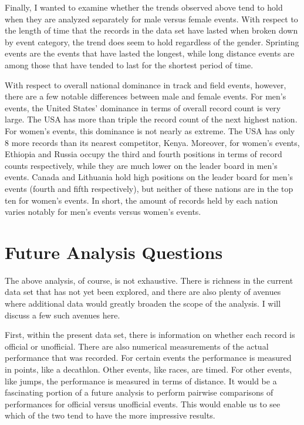 \documentclass{article}
\begin{document}
Finally, I wanted to examine whether the trends observed above tend to hold when they are analyzed separately for 
male versus female events.  With respect to the length of time that the records in the data set have lasted when 
broken down by event category, the trend does seem to hold regardless of the gender.  Sprinting events are the 
events that have lasted the longest, while long distance events are among those that have tended to last for the 
shortest period of time.  

With respect to overall national dominance in track and field events, however, there are a few notable differences 
between male and female events.  For men's events, the United States' dominance in terms of overall record count 
is very large.  The USA has more than triple the record count of the next highest nation.  For women's events, 
this dominance is not nearly as extreme.  The USA has only $8$ more records than its nearest competitor, Kenya.  
Moreover, for women's events, Ethiopia and Russia occupy the third and fourth positions in terms of record counts 
respectively, while they are much lower on the leader board in men's events.  Canada and Lithuania hold high 
positions on the leader board for men's events (fourth and fifth respectively), but neither of these nations are 
in the top ten for women's events.  In short, the amount of records held by each nation varies notably for men's 
events versus women's events.  

\section{Future Analysis Questions}

The above analysis, of course, is not exhaustive.  There is richness in the current data set that has not yet been 
explored, and there are also plenty of avenues where additional data would greatly broaden the scope of the analysis.  
I will discuss a few such avenues here.  

First, within the present data set, there is information on whether each record is official or unofficial.  There 
are also numerical measurements of the actual performance that was recorded.  For certain events the performance is 
measured in points, like a decathlon.  Other events, like races, are timed.  For other events, like jumps, the 
performance is measured in terms of distance.  It would be a fascinating portion of a future analysis to perform 
pairwise comparisons of performances for official versus unofficial events.  This 
would enable us to see which of the two tend to have the more impressive results.  
\end{document}
